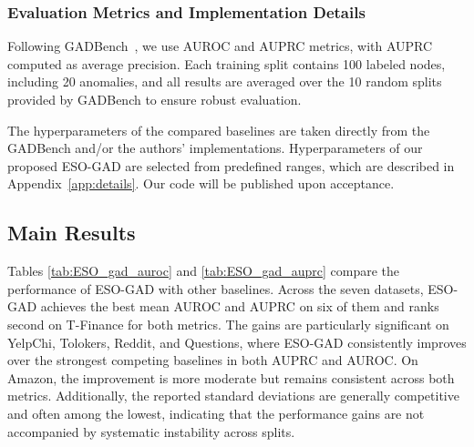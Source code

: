 \subsubsection{Evaluation Metrics and Implementation Details}
Following GADBench~\citep{GADBench}, we use AUROC and AUPRC metrics, with AUPRC computed as average precision. Each training split contains 100 labeled nodes, including 20 anomalies, and all results are averaged over the 10 random splits provided by GADBench to ensure robust evaluation.

The hyperparameters of the compared baselines are taken directly from the GADBench and/or the authors' implementations.  Hyperparameters of our proposed ESO-GAD are selected from predefined ranges, which are described in Appendix~\ref{app:details}.
Our code will be published upon acceptance.
\subsection{Main Results}\label{sec:experimental-results}
\label{sec:rq1}


% 
Tables \ref{tab:ESO_gad_auroc} and \ref{tab:ESO_gad_auprc} compare the performance of ESO-GAD with other baselines.
Across the seven datasets, ESO-GAD achieves the best mean AUROC and AUPRC on six of them and ranks second on T-Finance for both metrics. 
The gains are particularly significant on YelpChi, Tolokers, Reddit, and Questions, where ESO-GAD consistently improves over the strongest competing baselines in both AUPRC and AUROC.
On Amazon, the improvement is more moderate but remains consistent across both metrics.
Additionally, the reported standard deviations are generally competitive and often among the lowest, indicating that the performance gains are not accompanied by systematic instability across splits.

